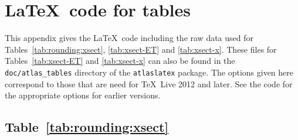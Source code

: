 \documentclass[UKenglish,texlive=2016]{\ATLASLATEXPATH atlasdoc}
\begin{document}
\appendix
\section{\LaTeX\ code for tables}
\label{sec:raw-data}

This appendix gives the \LaTeX\ code including the raw data used for 
Tables~\ref{tab:rounding:xsect}, 
\ref{tab:xsect-ET} and \ref{tab:xsect-x}.
These files for Tables~\ref{tab:xsect-ET} and \ref{tab:xsect-x} can also be 
found in the \texttt{doc/atlas\_tables} directory of the \texttt{atlaslatex} package.
The options given here correspond to those that are need for \TeX\ Live 2012 and later.
See the code for the appropriate options for earlier versions.

\subsection{Table~\protect\ref{tab:rounding:xsect}}
\end{document}

